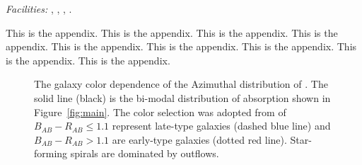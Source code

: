\documentclass{emulateapj}
\begin{document}
{\it Facilities:} , , , .


\appendix

This is the appendix.
This is the appendix.
This is the appendix.
This is the appendix.
This is the appendix.
This is the appendix.
This is the appendix.
This is the appendix.
This is the appendix.

\begin{figure*}
\caption[angle=0]{The galaxy color dependence of the Azimuthal
distribution of {\MgII}. The solid line (black) is the bi-modal
distribution of {\MgII} absorption shown in Figure~\ref{fig:main}. The
color selection was adopted from \citet{chen10a} of $B_{AB}-R_{AB}
\leq 1.1$ represent late-type galaxies (dashed blue line) and
$B_{AB}-R_{AB} > 1.1$ are early-type galaxies (dotted red
line). Star-forming spirals are dominated by outflows. }
\label{fig:Phi-masses}
\end{figure*}
\end{document}
